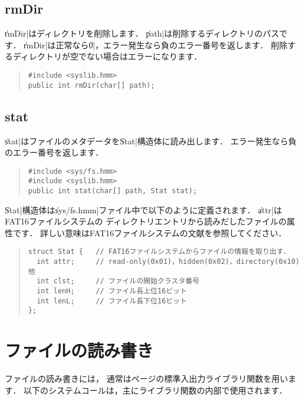 \subsection{rmDir}

\|rmDir|はディレクトリを削除します．
\|path|は削除するディレクトリのパスです．
\|rmDir|は正常なら\|0|，エラー発生なら負のエラー番号を返します．
削除するディレクトリが空でない場合はエラーになります．

\begin{quote}
\begin{verbatim}
#include <syslib.hmm>
public int rmDir(char[] path);
\end{verbatim}
\end{quote}

\subsection{stat}

\|stat|はファイルのメタデータを\|Stat|構造体に読み出します．
エラー発生なら負のエラー番号を返します．

\begin{quote}
\begin{verbatim}
#include <sys/fs.hmm>
#include <syslib.hmm>
public int stat(char[] path, Stat stat);
\end{verbatim}
\end{quote}

\|Stat|構造体は\|sys/fs.hmm|ファイル中で以下のように定義されます．
\|attr|はFAT16ファイルシステムの
ディレクトリエントリから読みだしたファイルの属性です．
詳しい意味はFAT16ファイルシステムの文献を参照してください．

\begin{quote}
\begin{verbatim}
struct Stat {   // FAT16ファイルシステムからファイルの情報を取り出す．
  int attr;     // read-only(0x01)，hidden(0x02)，directory(0x10) 他
  int clst;     // ファイルの開始クラスタ番号
  int lenH;     // ファイル長上位16ビット
  int lenL;     // ファイル長下位16ビット
};
\end{verbatim}
\end{quote}

\section{ファイルの読み書き}

ファイルの読み書きには，
通常は\pageref{chap4:stdio}ページの標準入出力ライブラリ関数を用います．
以下のシステムコールは，主にライブラリ関数の内部で使用されます．

